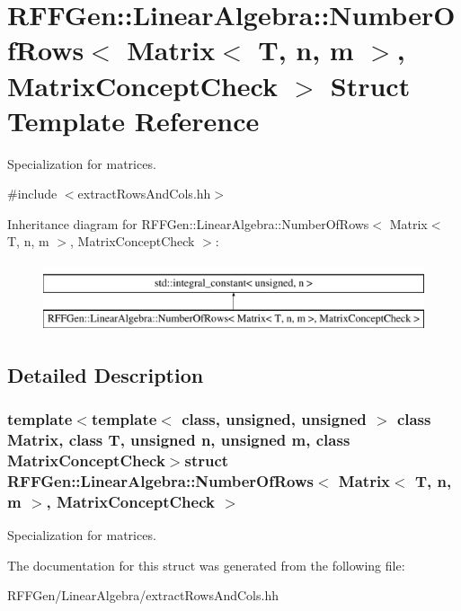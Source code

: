 \hypertarget{structRFFGen_1_1LinearAlgebra_1_1NumberOfRows_3_01Matrix_3_01T_00_01n_00_01m_01_4_00_01MatrixConceptCheck_01_4}{\section{R\-F\-F\-Gen\-:\-:Linear\-Algebra\-:\-:Number\-Of\-Rows$<$ Matrix$<$ T, n, m $>$, Matrix\-Concept\-Check $>$ Struct Template Reference}
\label{structRFFGen_1_1LinearAlgebra_1_1NumberOfRows_3_01Matrix_3_01T_00_01n_00_01m_01_4_00_01MatrixConceptCheck_01_4}
}


Specialization for matrices.  




{\ttfamily \#include $<$extract\-Rows\-And\-Cols.\-hh$>$}

Inheritance diagram for R\-F\-F\-Gen\-:\-:Linear\-Algebra\-:\-:Number\-Of\-Rows$<$ Matrix$<$ T, n, m $>$, Matrix\-Concept\-Check $>$\-:\begin{figure}[H]
\begin{center}
\leavevmode
\includegraphics[height=2.000000cm]{structRFFGen_1_1LinearAlgebra_1_1NumberOfRows_3_01Matrix_3_01T_00_01n_00_01m_01_4_00_01MatrixConceptCheck_01_4}
\end{center}
\end{figure}


\subsection{Detailed Description}
\subsubsection*{template$<$template$<$ class, unsigned, unsigned $>$ class Matrix, class T, unsigned n, unsigned m, class Matrix\-Concept\-Check$>$struct R\-F\-F\-Gen\-::\-Linear\-Algebra\-::\-Number\-Of\-Rows$<$ Matrix$<$ T, n, m $>$, Matrix\-Concept\-Check $>$}

Specialization for matrices. 

The documentation for this struct was generated from the following file\-:\begin{DoxyCompactItemize}
\item 
R\-F\-F\-Gen/\-Linear\-Algebra/extract\-Rows\-And\-Cols.\-hh\end{DoxyCompactItemize}
